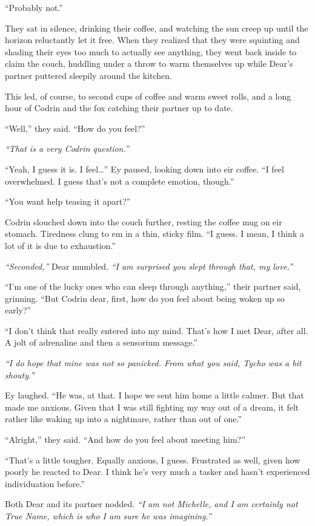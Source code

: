 ``Probably not.''

They sat in silence, drinking their coffee, and watching the sun creep up until the horizon reluctantly let it free. When they realized that they were squinting and shading their eyes too much to actually see anything, they went back inside to claim the couch, huddling under a throw to warm themselves up while Dear's partner puttered sleepily around the kitchen.

This led, of course, to second cups of coffee and warm sweet rolls, and a long hour of Codrin and the fox catching their partner up to date.

``Well,'' they said. ``How do you feel?''

\emph{``That is a very Codrin question.''}

``Yeah, I guess it is. I feel\ldots{}'' Ey paused, looking down into eir coffee. ``I feel overwhelmed. I guess that's not a complete emotion, though.''

``You want help teasing it apart?''

Codrin slouched down into the couch further, resting the coffee mug on eir stomach. Tiredness clung to em in a thin, sticky film. ``I guess. I mean, I think a lot of it is due to exhaustion.''

\emph{``Seconded,''} Dear mumbled. \emph{``I am surprised you slept through that, my love.''}

``I'm one of the lucky ones who can sleep through anything,'' their partner said, grinning. ``But Codrin dear, first, how do you feel about being woken up so early?''

``I don't think that really entered into my mind. That's how I met Dear, after all. A jolt of adrenaline and then a sensorium message.''

\emph{``I do hope that mine was not so panicked. From what you said, Tycho was a bit shouty.''}

Ey laughed. ``He was, at that. I hope we sent him home a little calmer. But that made me anxious. Given that I was still fighting my way out of a dream, it felt rather like waking up into a nightmare, rather than out of one.''

``Alright,'' they said. ``And how do you feel about meeting him?''

``That's a little tougher. Equally anxious, I guess. Frustrated as well, given how poorly he reacted to Dear. I think he's very much a tasker and hasn't experienced individuation before.''

Both Dear and its partner nodded. \emph{``I am not Michelle, and I am certainly not True Name, which is who I am sure he was imagining.''}

